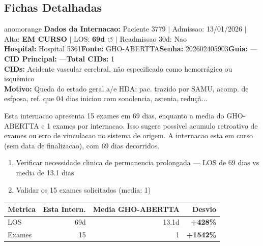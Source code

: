 \documentclass[a4paper,10pt]{article}
\begin{document}
\subsection{Fichas Detalhadas}
\begin{anomalycard}[Internacao 7232 | GHO-ABERTTA | ALTO (z=3.77)]{anomorange}
\textbf{Dados da Internacao:} Paciente 3779 $\mid$ Admissao: 13/01/2026 $\mid$ Alta: \textcolor{anomorange}{\textbf{EM CURSO}} $\mid$ LOS: \textbf{69d \textcolor{anomorange}{$\circlearrowleft$}} $\mid$ Readmissao 30d: Nao\\
\textbf{Hospital:} Hospital 5361\quad\textbf{Fonte:} GHO-ABERTTA\quad\textbf{Senha:} 202602405903\quad\textbf{Guia:} ---\\
\textbf{CID Principal:} {\small ---}\quad\textbf{Total CIDs:} 1\\

\textbf{CIDs:} {\scriptsize Acidente vascular cerebral, não especificado como hemorrágico ou isquêmico}\\

\textbf{Motivo:} {\scriptsize Queda do estado geral a/e HDA: pac. trazido por SAMU, acomp. de esfposa, ref. que 04 dias iniciou com sonolencia, astenia, reduçã...}\\

\vspace{2pt}\begin{tcolorbox}[colback=severityred!20,colframe=anomorange,title={\textbf{Interpretacao de Negocio}},fonttitle=\bfseries\small,left=4pt,right=4pt,top=3pt,bottom=3pt]
{\small Esta internacao apresenta 15 exames em 69 dias, enquanto a media do GHO-ABERTTA e 1 exames por internacao. Isso sugere possivel acumulo retroativo de exames ou erro de vinculacao no sistema de origem. A internacao esta em curso (sem data de finalizacao), com 69 dias decorridos.}
\end{tcolorbox}
\begin{tcolorbox}[colback=severityyellow!30,colframe=anomorange,title={\textbf{Recomendacoes Especificas}},fonttitle=\bfseries\small,left=4pt,right=4pt,top=3pt,bottom=3pt]
\begin{enumerate}[nosep,leftmargin=16pt]
\item {\small Verificar necessidade clinica de permanencia prolongada --- LOS de 69 dias vs media de 13.1 dias}
\item {\small Validar os 15 exames solicitados (media: 1)}
\end{enumerate}
\end{tcolorbox}
\begin{center}\begin{tabular}{l r r r}\toprule\textbf{Metrica} & \textbf{Esta Intern.} & \textbf{Media GHO-ABERTTA} & \textbf{Desvio} \\\midrule
LOS & 69d & 13.1d & \textcolor{anomred}{\textbf{+428\%}} \\
Exames & 15 & 1 & \textcolor{anomred}{\textbf{+1542\%}} \\
\bottomrule\end{tabular}\end{center}


\end{anomalycard}
\end{document}
